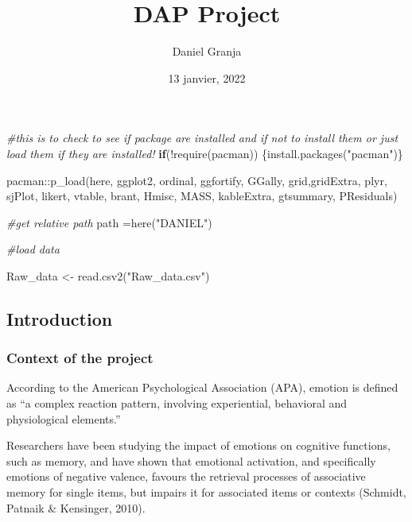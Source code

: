 \documentclass[
]{article}
\title{DAP Project}
\author{Daniel Granja}
\date{13 janvier, 2022}
\newenvironment{Shaded}{\begin{snugshade}}{\end{snugshade}}
\newcommand{\CommentTok}[1]{\textcolor[rgb]{0.56,0.35,0.01}{\textit{#1}}}
\newcommand{\ControlFlowTok}[1]{\textcolor[rgb]{0.13,0.29,0.53}{\textbf{#1}}}
\newcommand{\FunctionTok}[1]{\textcolor[rgb]{0.00,0.00,0.00}{#1}}
\newcommand{\NormalTok}[1]{#1}
\newcommand{\OtherTok}[1]{\textcolor[rgb]{0.56,0.35,0.01}{#1}}
\newcommand{\SpecialCharTok}[1]{\textcolor[rgb]{0.00,0.00,0.00}{#1}}
\newcommand{\StringTok}[1]{\textcolor[rgb]{0.31,0.60,0.02}{#1}}
\begin{document}
\maketitle

\begin{Shaded}
\begin{Highlighting}[]
\CommentTok{\#this is to check to see if package are installed and if not to install them or just load them if they are installed!}
\ControlFlowTok{if}\NormalTok{(}\SpecialCharTok{!}\FunctionTok{require}\NormalTok{(pacman)) \{}\FunctionTok{install.packages}\NormalTok{(}\StringTok{"pacman"}\NormalTok{)\}}

\NormalTok{pacman}\SpecialCharTok{::}\FunctionTok{p\_load}\NormalTok{(here, ggplot2, ordinal, ggfortify, GGally, grid,gridExtra, plyr, sjPlot, likert, vtable, brant, Hmisc, MASS, kableExtra, gtsummary, PResiduals)}

\CommentTok{\#get relative path}
\NormalTok{path }\OtherTok{=}\FunctionTok{here}\NormalTok{(}\StringTok{"DANIEL"}\NormalTok{)}

\CommentTok{\#load data }

\NormalTok{Raw\_data }\OtherTok{\textless{}{-}} \FunctionTok{read.csv2}\NormalTok{(}\StringTok{"Raw\_data.csv"}\NormalTok{)}
\end{Highlighting}
\end{Shaded}

\hypertarget{introduction}{%
\subsection{Introduction}\label{introduction}}

\hypertarget{context-of-the-project}{%
\subsubsection{Context of the project}\label{context-of-the-project}}

According to the American Psychological Association (APA), emotion is
defined as ``a complex reaction pattern, involving experiential,
behavioral and physiological elements.''

Researchers have been studying the impact of emotions on cognitive
functions, such as memory, and have shown that emotional activation, and
specifically emotions of negative valence, favours the retrieval
processes of associative memory for single items, but impairs it for
associated items or contexts (Schmidt, Patnaik \& Kensinger, 2010).
\end{document}
